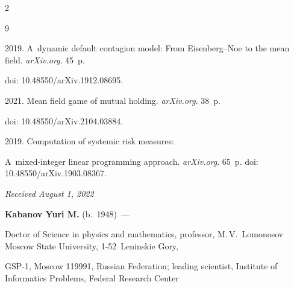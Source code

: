 \begin{multicols}{2}
{{\begin{thebibliography}{9}

 2019. A~dynamic default contagion model: From Eisenberg--Noe to the mean field.  \textit{arXiv.org}. 45~p. 

doi: 10.48550/arXiv.1912.08695.

  






 2021. Mean field game of mutual holding. \textit{arXiv.org}. 38~p. 

doi: 10.48550/arXiv.2104.03884.










 2019. Computation of systemic risk measures: 

A~mixed-integer linear programming approach. \textit{arXiv.org}. 65~p. doi: 10.48550/arXiv.1903.08367.

\end{thebibliography} } }



\end{multicols}



\vspace*{-6pt}



\hfill{\small\textit{Received August 1, 2022}}



\vspace*{-18pt}







\Contr






\noindent

\textbf{Kabanov Yuri M.} (b.\ 1948)~--- 

Doctor of Science in physics and mathematics, professor, M.\,V.~Lomonosov Moscow State University, 1-52~Leninskie Gory, 

GSP-1, Moscow 119991, Russian Federation; leading scientist, Institute of Informatics Problems, Federal Research Center 

